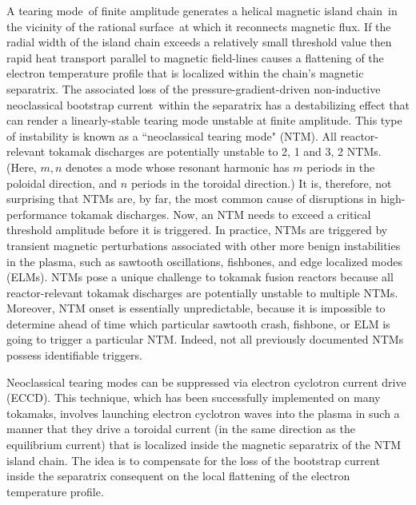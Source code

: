\documentclass[12pt,prb,aps]{revtex4-1}
\begin{document}
A tearing mode\,\cite{tear1} of finite amplitude generates a helical magnetic island chain\,\cite{ntm1} in the vicinity of the rational surface\,\cite{ideal3} at which it reconnects magnetic flux.
If the radial width of the island chain exceeds a relatively small threshold value then rapid  heat transport parallel to magnetic field-lines causes a flattening of the  electron temperature profile
that is localized within the chain's magnetic separatrix.\cite{ntm2} The associated loss of the pressure-gradient-driven non-inductive neoclassical bootstrap current\,\cite{ntm3} within the separatrix
has a destabilizing effect that can render a linearly-stable tearing mode unstable at finite amplitude. This type of instability is known as a ``neoclassical tearing mode"  (NTM).\cite{tftr,ntm4c,ntm4b,ntm4a}  All reactor-relevant tokamak
discharges are potentially unstable  to 2, 1 and 3, 2 NTMs.\cite{ntm4,ntm5}  (Here, $m, n$ denotes a mode whose resonant harmonic has $m$ periods in the poloidal
direction, and $n$ periods in the toroidal direction.) It is, therefore, not  surprising that NTMs are, by far, the most common cause of disruptions in high-performance  tokamak
discharges.\cite{iter,ntm4,ntm5,vries}
Now, an NTM needs to exceed a critical  threshold amplitude
before it is triggered. In practice, NTMs are
triggered by transient magnetic perturbations associated with other more benign instabilities in the plasma, such as sawtooth oscillations, fishbones, and
edge localized modes (ELMs).\cite{ntm4,ntm5,sawtooth,elm} NTMs pose a unique challenge to tokamak fusion reactors  because  all reactor-relevant tokamak discharges
are potentially unstable to multiple NTMs. Moreover, NTM onset is essentially unpredictable, because it
is impossible to determine ahead of time which particular sawtooth crash, fishbone, or ELM is going to trigger a particular NTM.\cite{nstx} Indeed, not all previously documented NTMs possess identifiable
triggers.\cite{ntm6} 

Neoclassical tearing  modes can be suppressed via electron cyclotron current drive (ECCD).\cite{zohm,prater} This technique, which has been
successfully implemented on many tokamaks,\cite{eccd1,eccd2,eccd3,eccd3a,eccd3b,eccd4,eccd5} involves
launching electron cyclotron waves into the plasma in such a manner that they drive a toroidal current (in the same direction as the equilibrium current) that is 
localized  inside the magnetic separatrix of
the NTM island chain. The idea is to compensate for the loss of the bootstrap current inside the separatrix consequent on the local flattening
of the electron temperature profile.\cite{ntm4,ntm5} 
\end{document}

